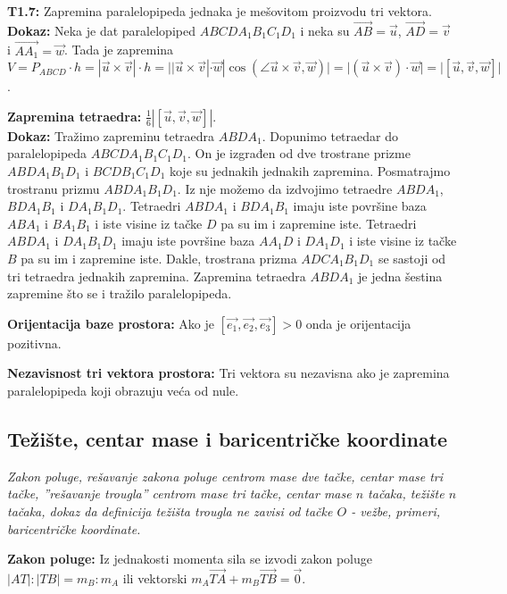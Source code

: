 \documentclass[12pt]{article}
\newcommand{\vek}[1]{\overrightarrow{#1}}
\begin{document}
\textbf{T1.7:} Zapremina paralelopipeda jednaka je mešovitom proizvodu tri
vektora.\\
\textbf{Dokaz:} Neka je dat paralelopiped $ABCDA_1B_1C_1D_1$ i neka su
$\vek{AB}=\vek{u}$, $\vek{AD}=\vek{v}$ i $\vek{AA_1}=\vek{w}$. Tada je
zapremina $V=P_{ABCD}\cdot h=|\vek{u}\times\vek{v}|\cdot h=
    ||\vek{u}\times\vek{v}|\cdot \vek{w}|\cos(\angle \vek{u}\times
    \vek{v},\vek{w})|=|(\vek{u}\times\vek{v}) \cdot \vek{w}|=|[\vek{u},\vek{v},
    \vek{w}]|$.
\par

\textbf{Zapremina tetraedra:} $\frac{1}{6}|[\vek{u},\vek{v},\vek{w}]|$.\\
\textbf{Dokaz:} Tražimo zapreminu tetraedra $ABDA_1$. Dopunimo tetraedar do
paralelopipeda $ABCDA_1B_1C_1D_1$. On je izgrađen od dve trostrane prizme
$ABDA_1B_1D_1$ i $BCDB_1C_1D_1$ koje su jednakih jednakih zapremina.
Posmatrajmo trostranu prizmu $ABDA_1B_1D_1$. Iz nje možemo da izdvojimo
tetraedre $ABDA_1$, $BDA_1B_1$ i $DA_1B_1D_1$. Tetraedri $ABDA_1$ i $BDA_1B_1$
imaju iste površine baza $ABA_1$ i $BA_1B_1$ i iste visine iz tačke $D$ pa su
im i zapremine iste. Tetraedri $ABDA_1$ i $DA_1B_1D_1$ imaju iste površine baza
$AA_1D$ i $DA_1D_1$ i iste visine iz tačke $B$ pa su im i zapremine iste.
Dakle, trostrana prizma $ADCA_1B_1D_1$ se sastoji od tri tetraedra jednakih
zapremina. Zapremina tetraedra $ABDA_1$ je jedna šestina zapremine
što se i tražilo paralelopipeda.
\par

\textbf{Orijentacija baze prostora:} Ako je $[\vek{e_1},\vek{e_2},\vek{e_3}]>0$
onda je orijentacija pozitivna.
\par

\textbf{Nezavisnost tri vektora prostora:} Tri vektora su nezavisna ako je
zapremina paralelopipeda koji obrazuju veća od nule.

\subsection{Težište, centar mase i baricentričke koordinate}
\textit{Zakon poluge, rešavanje zakona poluge centrom mase dve tačke, centar
    mase tri tačke, ”rešavanje trougla” centrom mase tri tačke, centar mase $n$
    tačaka, težište $n$ tačaka, dokaz da definicija težišta trougla ne zavisi od
    tačke $O$ - vežbe, primeri, baricentričke koordinate.}
\par
\vspace*{1cm}

\textbf{Zakon poluge:} Iz jednakosti momenta sila se izvodi zakon poluge
$|AT|:|TB|=m_B:m_A$ ili vektorski $m_A\vek{TA}+m_B\vek{TB}=\vek{0}$.
\par
\end{document}
